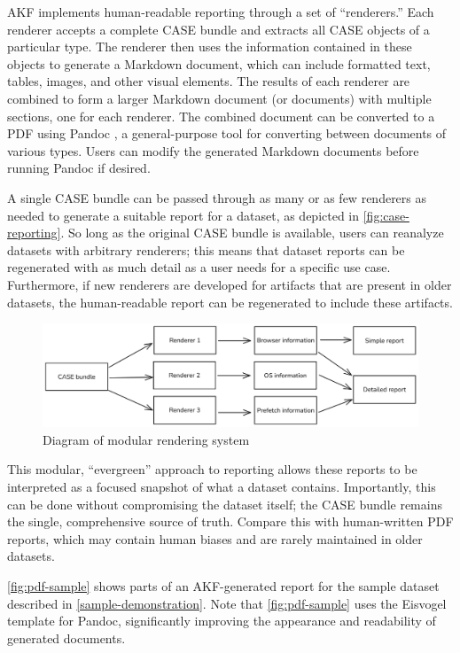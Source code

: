 \documentclass[final,5p,times,twocolumn]{elsarticle}
\begin{document}
AKF implements human-readable reporting through a set of ``renderers.''
Each renderer accepts a complete CASE bundle and extracts all CASE
objects of a particular type. The renderer then uses the information
contained in these objects to generate a Markdown document, which can
include formatted text, tables, images, and other visual elements. The
results of each renderer are combined to form a larger Markdown document
(or documents) with multiple sections, one for each renderer. The
combined document can be converted to a PDF using Pandoc
\citep{macfarlanePandoc2025}, a general-purpose tool for converting
between documents of various types. Users can modify the generated
Markdown documents before running Pandoc if desired.

A single CASE bundle can be passed through as many or as few renderers
as needed to generate a suitable report for a dataset, as depicted in
\autoref{fig:case-reporting}. So long as the original CASE bundle is
available, users can reanalyze datasets with arbitrary renderers; this
means that dataset reports can be regenerated with as much detail as a
user needs for a specific use case. Furthermore, if new renderers are
developed for artifacts that are present in older datasets, the
human-readable report can be regenerated to include these artifacts.

\begin{figure}[htbp]
\centering
\includegraphics[width=1\linewidth]{case-reporting.png}
\caption{Diagram of modular rendering system}\label{fig:case-reporting}
\end{figure}

This modular, ``evergreen'' approach to reporting allows these reports
to be interpreted as a focused snapshot of what a dataset contains.
Importantly, this can be done without compromising the dataset itself;
the CASE bundle remains the single, comprehensive source of truth.
Compare this with human-written PDF reports, which may contain human
biases and are rarely maintained in older datasets.

\autoref{fig:pdf-sample} shows parts of an AKF-generated report for the
sample dataset described in \autoref{sample-demonstration}. Note that
\autoref{fig:pdf-sample} uses the Eisvogel template
\citep{waglerWandmalfarbePandoclatextemplate2025} for Pandoc,
significantly improving the appearance and readability of generated
documents.
\end{document}
